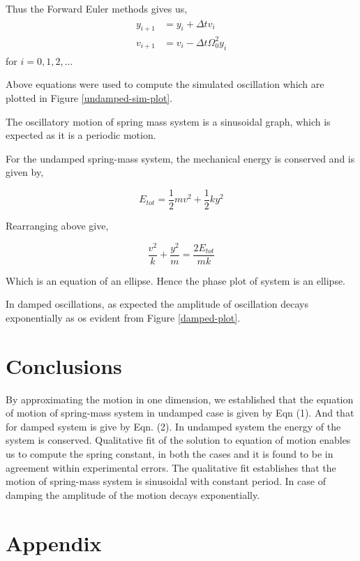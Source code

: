 \documentclass[letterpaper,12pt]{article}
\begin{document}
Thus the Forward Euler methods gives us,
\begin{eqnarray*}
  \begin{split}
    y_{i+1} &= y_i + \Delta t v_i \\
    v_{i+1} &= v_i -\Delta t \Omega_0^2 y_i
  \end{split}
\end{eqnarray*}
for $i = 0, 1, 2, \dots$

Above equations were used to compute the simulated oscillation which are plotted in Figure \ref{undamped-sim-plot}. 

The oscillatory motion of spring mass system is a sinusoidal graph, which is expected as it is a periodic motion.

For the undamped spring-mass system, the mechanical energy is conserved and is given by,

$$E_{tot} = \frac{1}{2}mv^2 + \frac{1}{2}ky^2$$

Rearranging above give,

$$\frac{v^2}{k} + \frac{y^2}{m} = \frac{2E_{tot}}{mk}$$

Which is an equation of an ellipse. Hence the phase plot of system is an ellipse.

In damped oscillations, as expected the amplitude of oscillation decays exponentially as os evident
from Figure \ref{damped-plot}.

\section{Conclusions}

By approximating the motion in one dimension, we established that the equation of motion of spring-mass 
system in undamped case is given by Eqn (1). And that for damped system is give by Eqn. (2). In undamped 
system the energy of the system is conserved. Qualitative fit of the solution to equation of motion 
enables us to compute the spring constant, in both the cases and it is found to be in agreement within experimental errors.
The qualitative fit establishes that the motion of spring-mass system is sinusoidal with constant period. In 
case of damping the amplitude of the motion decays exponentially.

\pagebreak

\appendix

\section{Appendix}
\end{document}
